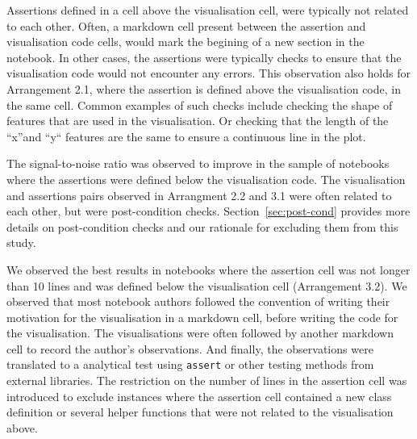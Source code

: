 \documentclass[conference]{IEEEtran}
\begin{document}
Assertions defined in a cell above the visualisation cell, were typically not related to each other. Often, a markdown cell present between the assertion and visualisation code cells, would mark the begining of a new section in the notebook. In other cases, the assertions were typically checks to ensure that the visualisation code would not encounter any errors. This observation also holds for Arrangement 2.1, where the assertion is defined above the visualisation code, in the same cell. Common examples of such checks include checking the shape of features that are used in the visualisation. Or checking that the length of the ``x''and ``y`` features are the same to ensure a continuous line in the plot.

The signal-to-noise ratio was observed to improve in the sample of notebooks where the assertions were defined below the visualisation code. The visualisation and assertions pairs observed in Arrangment 2.2 and 3.1 were often related to each other, but were post-condition checks. Section~\ref{sec:post-cond} provides more details on post-condition checks and our rationale for excluding them from this study.

We observed the best results in notebooks where the assertion cell was not longer than 10 lines and was defined below the visualisation cell (Arrangement 3.2). We observed that most notebook authors followed the convention of writing their motivation for the visualisation in a markdown cell, before writing the code for the visualisation. The visualisations were often followed by another markdown cell to record the author's observations. And finally, the observations were translated to a analytical test using \texttt{assert} or other testing methods from external libraries. The restriction on the number of lines in the assertion cell was introduced to exclude instances where the assertion cell contained a new class definition or several helper functions that were not related to the visualisation above.
\end{document}
